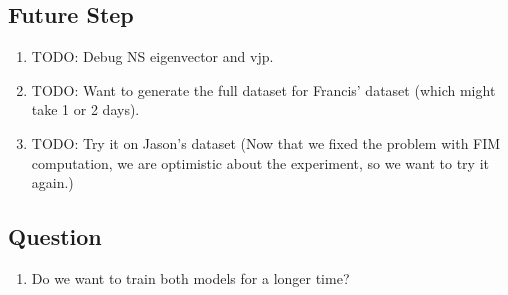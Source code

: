 \documentclass[
]{article}
\providecommand{\tightlist}{%
  \setlength{\itemsep}{0pt}\setlength{\parskip}{0pt}}\usepackage{longtable,booktabs,array}
\begin{document}
\subsection{Future Step}\label{future-step}

\begin{enumerate}
\def\labelenumi{\arabic{enumi}.}
\tightlist
\item
  TODO: Debug NS eigenvector and vjp.
\item
  TODO: Want to generate the full dataset for Francis' dataset (which
  might take 1 or 2 days).
\item
  TODO: Try it on Jason's dataset (Now that we fixed the problem with
  FIM computation, we are optimistic about the experiment, so we want to
  try it again.)
\end{enumerate}

\subsection{Question}\label{question}

\begin{enumerate}
\def\labelenumi{\arabic{enumi}.}
\tightlist
\item
  Do we want to train both models for a longer time?
\end{enumerate}
\end{document}
